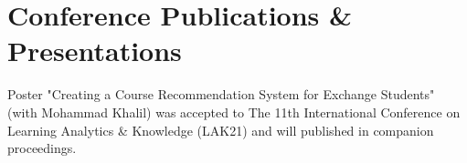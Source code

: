 \documentclass[a4paper, extended]{adcv}
\begin{document}






\section{Conference Publications \& Presentations}\label{sec:publications}

\ifextended

    Poster "Creating a Course Recommendation System for Exchange Students" (with Mohammad Khalil) was accepted to The 11th International Conference on Learning Analytics \& Knowledge (LAK21) and will published in companion proceedings.

  \begin{refsection}
      
    \nocite{musabirov_teaching_2020}%
    \nocite{marchenko_analysis_2018}
    \nocite{suschevskiy_network_2018}
    \nocite{Sunbelt2020}
    \nocite{LASINORDIC2019}
    \nocite{ICCSS2019}
    \nocite{INAS2019}
    \nocite{Netglow2018}
    \nocite{Sunbelt2018}
    
   \printbibliography[title={\vspace{-0.2cm}}, heading=subbibliography]
  \end{refsection}


    
\end{document}
